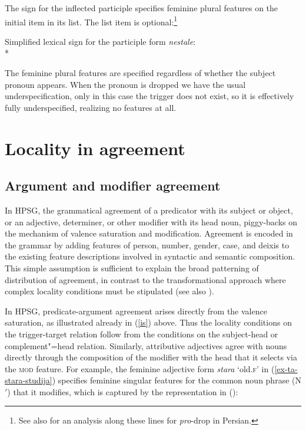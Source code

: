 \documentclass[output=paper
 	        ,biblatex
                ,babelshorthands
                ,newtxmath
                ,draftmode
                ,colorlinks, citecolor=brown
]{langscibook}
\begin{document}
\noindent
The sign for the inflected participle specifies feminine plural features on the initial item in its
\argst list.  The \subj list item is optional:\footnote{See also 
    for an analysis along these lines for \emph{pro}-drop in Persian.}

\begin{exe} 
\ex		\label{nestale} 
Simplified lexical sign for the participle form \textit{nestale}:\\*
\end{exe}

\noindent
The feminine plural features are specified regardless of whether  the subject pronoun appears.  When the pronoun is dropped we have the usual underspecification, only in this case the trigger does not exist, so it is effectively fully underspecified, realizing no features at all.  


\section{Locality in agreement} 
\label{agreement:sec-locality}

\subsection{Argument and modifier agreement}
\label{arg-mod-agr}

In HPSG, the grammatical agreement of a predicator with its subject or object, or an adjective, determiner, or other modifier with its head noun, piggy-backs on the mechanism of valence saturation and modification.   Agreement is encoded in the grammar by adding features of person, number, gender, case, and deixis to the existing feature descriptions involved in syntactic and semantic composition.  This simple assumption is sufficient to explain the broad patterning of distribution of agreement, in contrast to the transformational approach where complex locality conditions must be stipulated (see also ).   

In HPSG, predicate-argument agreement arises directly from the valence saturation, as illustrated
already in (\ref{is}) above.  Thus the locality conditions on the trigger-target relation follow
from the conditions on the subject-head or complement"=head relation.   Similarly, attributive
adjectives agree with nouns directly through the composition of the modifier with the head that it
selects via the \textsc{mod} feature.  For example, the  feminine adjective form
\textit{stara} `old.\textsc{f}' in (\ref{ex-ta-stara-studija}) specifies feminine singular features
for the common noun phrase (N$'$) that it modifies, which is captured by the representation
  in ():
\end{document}
